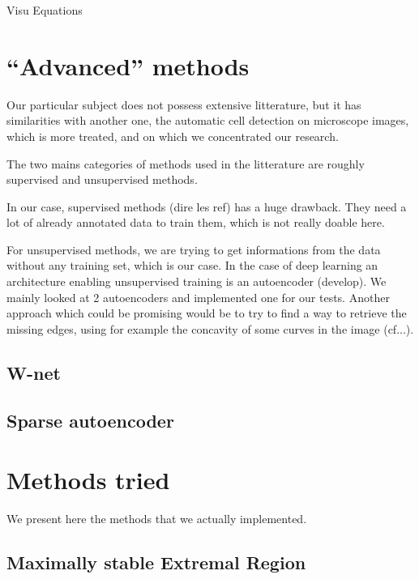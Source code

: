\documentclass{report}
\begin{document}
Visu  
Equations

\chapter{"`Advanced"' methods}

Our particular subject does not possess extensive litterature, but it has similarities with another one, the automatic cell detection on microscope images, which is more treated, and on which we concentrated our research.

The two mains categories of methods used in the litterature are roughly supervised and unsupervised methods.  \newline

In our case, supervised methods (dire les ref) has a huge drawback. They need a lot of already annotated data to train them, which is not really doable here.  \newline

For unsupervised methods, we are trying to get informations from the data without any training set, which is our case.
In the case of deep learning an architecture enabling unsupervised training is an autoencoder (develop). We mainly looked at 2 autoencoders and implemented one for our tests.
Another approach which could be promising would be to try to find a way to retrieve the missing edges, using for example the concavity of some curves in the image (cf...).

\section{W-net}

\section{Sparse autoencoder}



\chapter{Methods tried}
We present here the methods that we actually implemented.

\section{Maximally stable Extremal Region}
\end{document}

